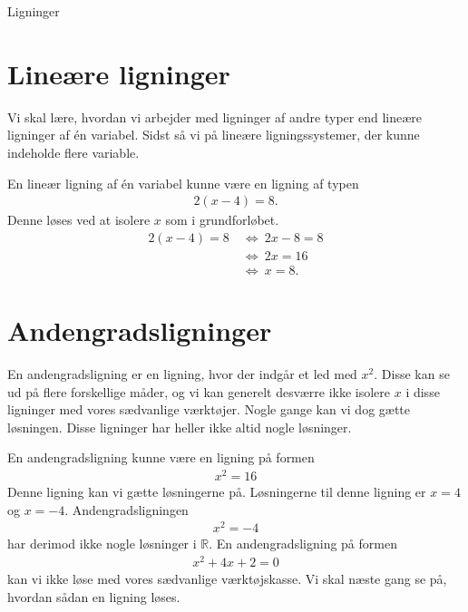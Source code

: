 \begin{center}
\Huge
	Ligninger	
\end{center}

\section*{Lineære ligninger}
Vi skal lære, hvordan vi arbejder med ligninger af andre typer end lineære ligninger af én variabel. Sidst så vi på lineære ligningssystemer, der kunne indeholde flere variable. 
\begin{exa}
	En lineær ligning af én variabel kunne være en ligning af typen
	\begin{align*}
		2(x-4) = 8.
	\end{align*}
	Denne løses ved at isolere $x$ som i grundforløbet.
	\begin{align*}
		2(x-4) = 8 \ &\Leftrightarrow \ 2x-8 = 8 \\
		&\Leftrightarrow	 \ 2x = 16 \\
		&\Leftrightarrow \ x = 8.
	\end{align*}
\end{exa}

\section*{Andengradsligninger}

En andengradsligning er en ligning, hvor der indgår et led med $x^2$. Disse kan se ud på flere forskellige måder, og vi kan generelt desværre ikke isolere $x$ i disse ligninger med vores sædvanlige værktøjer. Nogle gange kan vi dog gætte løsningen. Disse ligninger har heller ikke altid nogle løsninger.

\begin{exa}
	En andengradsligning kunne være en ligning på formen
	\begin{align*}
		x^2 = 16
	\end{align*}		
	Denne ligning kan vi gætte løsningerne på. Løsningerne til denne ligning er $x = 4$ og $x = -4$. 
	Andengradsligningen
	\begin{align*}
		x^2 = -4
	\end{align*}
	har derimod ikke nogle løsninger i $\mathbb{R}$.
	En andengradsligning på formen 
	\begin{align*}
		x^2 + 4x + 2 = 0
	\end{align*}
	kan vi ikke løse med vores sædvanlige værktøjskasse. Vi skal næste gang se på, hvordan sådan en ligning 
	løses.
\end{exa}

